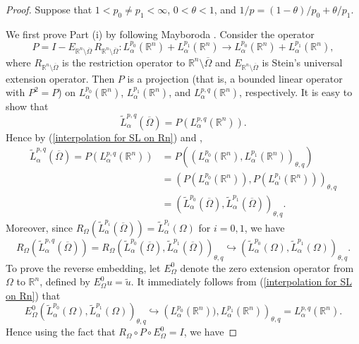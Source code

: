 \documentclass[reqno,centertags,11pt]{amsart}
\theoremstyle{definition}
\numberwithin{thm}{section}
\numberwithin{equation}{section}
\newcommand{\R}{{\mathbb{R}}}
\begin{document}
\begin{proof}
Suppose that    $1< p_0 \neq p_1 < \infty$, $0<\theta < 1$, and $1/p=(1-\theta)/p_0 +\theta/p_1$.

We first prove Part (i) by following Mayboroda \cite{Mayb05}. Consider the operator
\[
P  = I  - E_{\R^n \setminus \overline{\Omega}}  \, R_{\R^n \setminus \overline{\Omega}} : L_\alpha^{p_0}(\R^n )+ L_\alpha^{p_1}(\R^n ) \rightarrow L_\alpha^{p_0}(\R^n )+ L_\alpha^{p_1}(\R^n ),
\]
where $R_{\R^n \setminus \overline{\Omega}}$ is the restriction operator to $\R^n \setminus \overline{\Omega}$  and $E_{\R^n \setminus \overline{\Omega}}$ is   Stein's universal extension operator.
Then $P$ is a projection (that is, a bounded linear operator with $P^2 =P$) on $L_\alpha^{p_0}(\R^n )$, $L_\alpha^{p_1}(\R^n )$, and $L_\alpha^{p,q}(\R^n )$, respectively.
It is easy to show that
$$
\widetilde{L}_\alpha^{p,q} (\overline{\Omega} )     = P (L_\alpha^{p,q}(\R^n ) ).
$$
Hence by (\ref{interpolation for SL on Rn}) and \cite[Lemma 3.1.9]{Mayb05},
\begin{align*}
\widetilde{L}_\alpha^{p,q} (\overline{\Omega} )     = P (L_\alpha^{p,q}(\R^n ) ) & = P  (\left( L_\alpha^{p_0 }(\R^n ), L_\alpha^{p_1}(\R^n ) \right)_{\theta,q}  ) \\
&=  \left( P  ( L_\alpha^{p_0 }(\R^n )  ), P  ( L_\alpha^{p_1}(\R^n )  ) \right)_{\theta,q} \\
& =\left( \widetilde{L}_\alpha^{p_0}(\overline{\Omega} )   ,\widetilde{L}_\alpha^{p_1}(\overline{\Omega} )   \right)_{\theta,q}.
\end{align*}
Moreover, since $R_\Omega  (\widetilde{L}_\alpha^{p_i } (\overline{\Omega} ) ) = \widetilde{L}_\alpha^{p_i}(\Omega )$ for $i=0,1$, we have
\[
R_\Omega  (\widetilde{L}_\alpha^{p,q} (\overline{\Omega} ) )
 = R_\Omega \left( \widetilde{L}_\alpha^{p_0}(\overline{\Omega} )   ,\widetilde{L}_\alpha^{p_1}(\overline{\Omega} )   \right)_{\theta,q}
  \hookrightarrow \left( \widetilde{L}_\alpha^{p_0}(\Omega )  ,\widetilde{L}_\alpha^{p_1}(\Omega ) \right)_{\theta,q}.
\]
To prove the reverse embedding, let  $E^0_\Omega$ denote the zero extension operator from $\Omega$ to $\R^n$, defined by $E^0_\Omega u = \widetilde{u}$. It immediately follows from  (\ref{interpolation for SL on Rn}) that 
$$
E_\Omega^0  \left( \widetilde{L}_\alpha^{p_0}(\Omega )  ,\widetilde{L}_\alpha^{p_1}(\Omega ) \right)_{\theta,q} \hookrightarrow  \left( L_\alpha^{p_0 } (\R^n ) )  , L_\alpha^{p_1 } ( \R^n )   \right)_{\theta,q} = L_\alpha^{p,q }(\R^n).
$$
Hence  using the fact that $R_\Omega\circ P\circ E^0_\Omega=I$, we have  

\end{proof}
\end{document}
